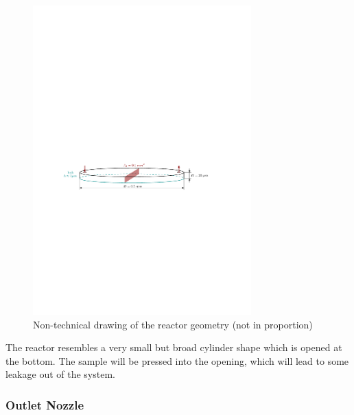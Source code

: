 	\begin{figure}[H]
	    \centering
	    \includegraphics[width=0.75\textwidth]{src/03_analytical-work/fig_reactor-geometry.pdf}
	    \caption{Non-technical drawing of the reactor geometry (not in proportion)}
	    \label{fig:geometry-reactor}
	\end{figure}
	The reactor resembles a very small but broad cylinder shape which is opened at the bottom.
	The sample will be pressed into the opening, which will lead to some leakage out of the system.
	
\subsubsection*{Outlet Nozzle}
	

